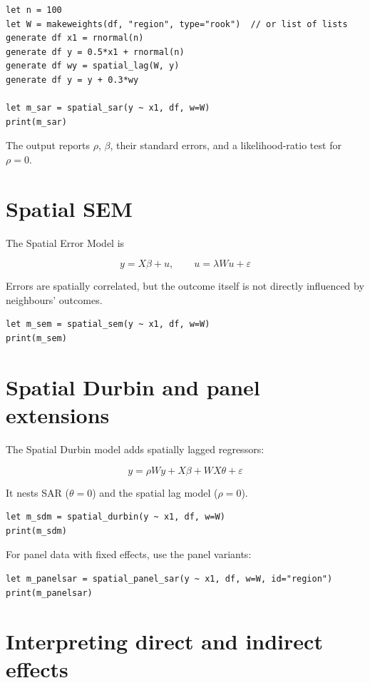 \begin{lstlisting}[caption={Spatial SAR}]
let n = 100
let W = makeweights(df, "region", type="rook")  // or list of lists
generate df x1 = rnormal(n)
generate df y = 0.5*x1 + rnormal(n)
generate df wy = spatial_lag(W, y)
generate df y = y + 0.3*wy

let m_sar = spatial_sar(y ~ x1, df, w=W)
print(m_sar)
\end{lstlisting}

The output reports $\rho$, $\beta$, their standard errors, and a
likelihood-ratio test for $\rho = 0$.

\section{Spatial SEM}

The Spatial Error Model is

\[
y = X\beta + u, \qquad u = \lambda W u + \varepsilon
\]

Errors are spatially correlated, but the outcome itself is not directly
influenced by neighbours' outcomes.

\begin{lstlisting}[caption={Spatial SEM}]
let m_sem = spatial_sem(y ~ x1, df, w=W)
print(m_sem)
\end{lstlisting}

\section{Spatial Durbin and panel extensions}

The Spatial Durbin model adds spatially lagged regressors:

\[
y = \rho W y + X\beta + W X \theta + \varepsilon
\]

It nests SAR ($\theta = 0$) and the spatial lag model ($\rho = 0$).

\begin{lstlisting}[caption={Spatial Durbin}]
let m_sdm = spatial_durbin(y ~ x1, df, w=W)
print(m_sdm)
\end{lstlisting}

For panel data with fixed effects, use the panel variants:

\begin{lstlisting}[caption={Spatial panel SAR}]
let m_panelsar = spatial_panel_sar(y ~ x1, df, w=W, id="region")
print(m_panelsar)
\end{lstlisting}

\section{Interpreting direct and indirect effects}

